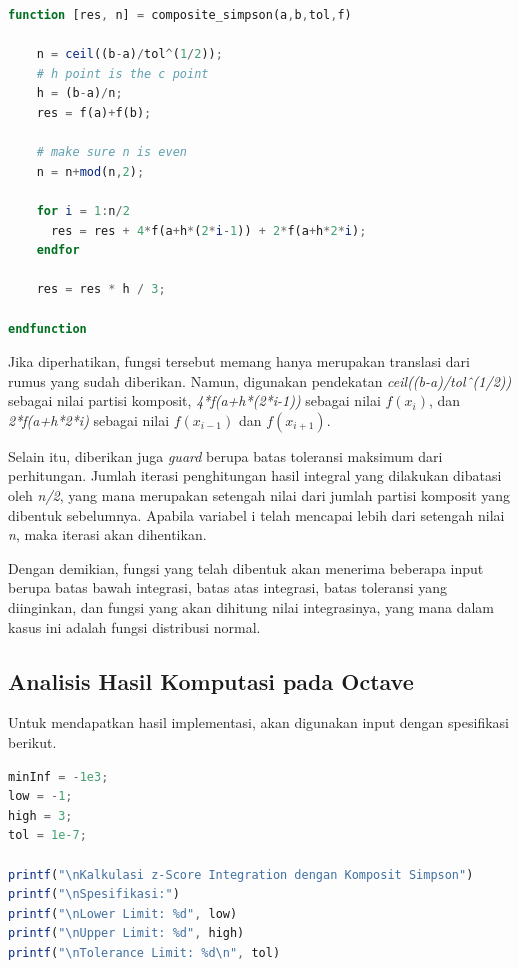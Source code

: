 \documentclass[journal,12pt,onecolumn,a4paper]{IEEEtran}
\begin{document}
\begin{center}
	\begin{lstlisting}[language=Octave]
function [res, n] = composite_simpson(a,b,tol,f)

	n = ceil((b-a)/tol^(1/2));
	# h point is the c point
	h = (b-a)/n;
	res = f(a)+f(b);
	 
	# make sure n is even
	n = n+mod(n,2);
	 
	for i = 1:n/2
	  res = res + 4*f(a+h*(2*i-1)) + 2*f(a+h*2*i);
	endfor
	 
	res = res * h / 3;
	 
endfunction
	\end{lstlisting}
\end{center}

Jika diperhatikan, fungsi tersebut memang hanya merupakan translasi dari rumus yang sudah diberikan. Namun, digunakan pendekatan \emph{ceil((b-a)/tolˆ(1/2))} sebagai nilai partisi komposit, \emph{4*f(a+h*(2*i-1))} sebagai nilai \(f(x_{i})\), dan  \emph{2*f(a+h*2*i)} sebagai nilai \(f(x_{i-1})\) dan \(f(x_{i+1})\).

Selain itu, diberikan juga \emph{guard} berupa batas toleransi maksimum dari perhitungan. Jumlah iterasi penghitungan hasil integral yang dilakukan dibatasi oleh \emph{n/2}, yang mana merupakan setengah nilai dari jumlah partisi komposit yang dibentuk sebelumnya. Apabila variabel i telah mencapai lebih dari setengah nilai \emph{n}, maka iterasi akan dihentikan.

Dengan demikian, fungsi yang telah dibentuk akan menerima beberapa input berupa batas bawah integrasi, batas atas integrasi, batas toleransi yang diinginkan, dan fungsi yang akan dihitung nilai integrasinya, yang mana dalam kasus ini adalah fungsi distribusi normal.

\subsection{Analisis Hasil Komputasi pada Octave}

Untuk mendapatkan hasil implementasi, akan digunakan input dengan spesifikasi berikut.

\begin{center}
	\begin{lstlisting}[language=Octave]
minInf = -1e3;
low = -1;
high = 3;
tol = 1e-7;
		
printf("\nKalkulasi z-Score Integration dengan Komposit Simpson")
printf("\nSpesifikasi:")
printf("\nLower Limit: %d", low)
printf("\nUpper Limit: %d", high)
printf("\nTolerance Limit: %d\n", tol)
	\end{lstlisting}
\end{center}
\end{document}
